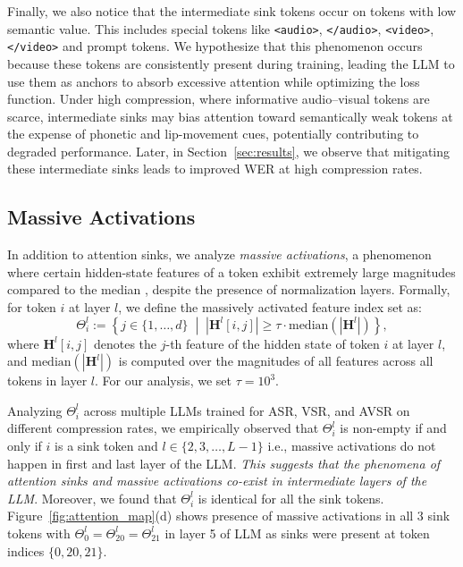 \documentclass{article}
\begin{document}
Finally, we also notice that the intermediate sink tokens occur on tokens with low semantic value. This includes special tokens like \texttt{<audio>}, \texttt{</audio>}, \texttt{<video>}, \texttt{</video>} and prompt tokens. We hypothesize that this phenomenon occurs because these tokens are consistently present during training, leading the LLM to use them as anchors to absorb excessive attention while optimizing the loss function. Under high compression, where informative audio–visual tokens are scarce, intermediate sinks may bias attention toward semantically weak tokens at the expense of phonetic and lip-movement cues, potentially contributing to degraded performance. Later, in Section~\ref{sec:results}, we observe that mitigating these intermediate sinks leads to improved WER at high compression rates.

\subsection{Massive Activations}
\label{subsec:activation}
In addition to attention sinks, we analyze \textit{massive activations}, a phenomenon where certain hidden-state features of a token exhibit extremely large magnitudes compared to the median \cite{sun2024massive}, despite the presence of normalization layers. Formally, for token $i$ at layer $l$, we define the massively activated feature index set as:
\begin{equation}
\Theta_i^l := \left\{ j \in \{1, \dots, d\} \;\middle|\; |\textbf{H}^l[i,j]| \ge \tau \cdot \text{median}(|\textbf{H}^l|) \right\},
\end{equation}
where $\textbf{H}^l[i,j]$ denotes the $j$-th feature of the hidden state of token $i$ at layer $l$, and $\text{median}(|\textbf{H}^l|)$ is computed over the magnitudes of all features across all tokens in layer $l$. For our analysis, we set $\tau = 10^3$.

Analyzing $\Theta_i^l$ across multiple LLMs trained for ASR, VSR, and AVSR on different compression rates, we empirically observed that $\Theta_i^l$ is non-empty if and only if $i$ is a sink token and $l\in \{2,3,\ldots,L-1\}$ i.e., massive activations do not happen in first and last layer of the LLM.  \textit{This suggests that the phenomena of attention sinks and massive activations co-exist in intermediate layers of the LLM}. Moreover, we found that $\Theta_i^l$ is identical for all the sink tokens. Figure~\ref{fig:attention_map}(d) shows presence of massive activations in all 3 sink tokens with $\Theta_0^l = \Theta_{20}^l = \Theta_{21}^l$ in layer 5 of LLM as sinks were present at token indices $\{0,20,21\}$.
\end{document}
